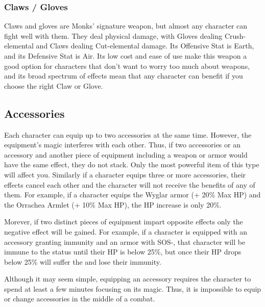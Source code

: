 \begin{tabwpn}[label=inv-pole,range=melee,type=physical,element=puncture,roll=earthvearth]
    
\end{tabwpn}
\clearpage

\subsubsection{Claws / Gloves}

Claws and gloves are Monks’ signature weapon, but almost any character can fight well with them. They deal physical damage, with Gloves dealing Crush-elemental and Claws dealing Cut-elemental damage. Its Offensive Stat is Earth, and its Defensive Stat is Air. Its low cost and ease of use make this weapon a good option for characters that don’t want to worry too much about weapons, and its broad spectrum of effects mean that any character can benefit if you choose the right Claw or Glove. 

\begin{tabwpn}[label=inv-claws,range=melee,type=physical,element=crush,roll=earthvair]
    
\end{tabwpn}
\clearpage
\subsection{Accessories}\label{subsec:inv-accessories}

\begin{multicols}{2}
Each character can equip up to two accessories at the same time.  However, the equipment's magic interferes with each other.  Thus, if two accessories or an accessory and another piece of equipment including a weapon or armor would have the same effect, they do not stack.  Only the most powerful item of this type will affect you.  Similarly if a character equips three or more accessories, their effects cancel each other and the character will not receive the benefits of any of them.  For example, if a character equips the Wyglar armor (+ 20\% Max HP) and the Orrachea Armlet (+ 10\% Max HP), the HP increase is only 20\%.

Morever, if two distinct pieces of equipment impart opposite effects only the negative effect will be gained.  For example, if a character is equipped with an accessory granting  immunity and an armor with SOS-, that character will be immune to the  status until their HP is below 25\%, but once their HP drops below 25\% will suffer the  and lose their immunity.

Although it may seem simple, equipping an accessory requires the character to spend at least a few minutes focusing on its magic.  Thus, it is impossible to equip or change accessories in the middle of a combat.
\end{multicols}

